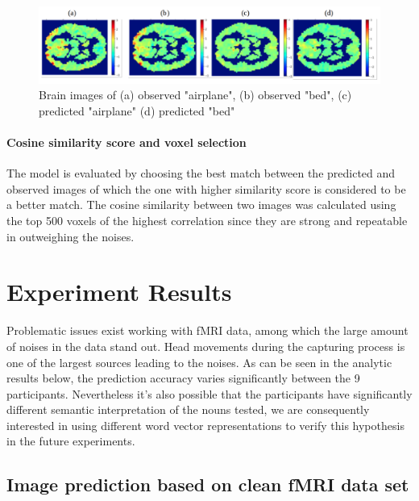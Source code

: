 \documentclass{article}
\begin{document}
\begin{figure}
\centering
\includegraphics[scale=0.2]{brain.png}
\caption{Brain images of (a) observed "airplane", (b) observed "bed", (c) predicted "airplane" (d) predicted "bed"}
\label{brain}
\end{figure}



\paragraph{Cosine similarity score and voxel selection}
The model is evaluated by choosing the best match between the predicted and observed images of which the one with higher similarity score is considered to be a better match. The cosine similarity between two images was calculated using the top 500 voxels of the highest correlation since they are strong and repeatable in outweighing the noises. 

\section{Experiment Results}
Problematic issues exist working with fMRI data, among which the large amount of noises in the data stand out. Head movements during the capturing process is one of the largest sources leading to the noises. As can be seen in the analytic results below, the prediction accuracy varies significantly between the 9 participants. Nevertheless it's also possible that the participants have significantly different semantic interpretation of the nouns tested, we are consequently interested in using different word vector representations to verify this hypothesis in the future experiments. 

\subsection{Image prediction based on clean fMRI data set}
\end{document}
